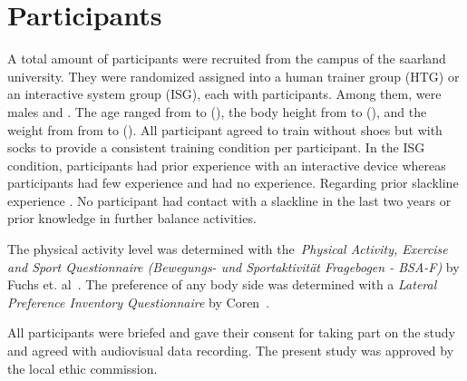 \section{Participants}\label{6_participants}
A total amount of  participants were recruited from the campus of the saarland university.
They were randomized assigned into a human trainer group (HTG) or an interactive system group (ISG), each with  participants.
Among them,  were males and .
The age ranged from  to  (), the body height from  to  (), and the weight from from  to  ().
All participant agreed to train without shoes but with socks to provide a consistent training condition per participant.
In the ISG condition,  participants had prior experience with an interactive device whereas  participants had few experience and  had no experience.
Regarding prior slackline experience .
No participant had contact with a slackline in the last two years or prior knowledge in further balance activities. 

The physical activity level was determined with the~\textit{Physical Activity, Exercise and Sport Questionnaire (Bewegungs- und Sportaktivität Fragebogen - BSA-F)} by Fuchs et. al~\cite{Fuchs2015-bsa}.
The preference of any body side was determined with a \textit{Lateral Preference Inventory Questionnaire} by Coren~\cite{Coren1993-lp}. 
 
All participants were briefed and gave their consent for taking part on the study and agreed with audiovisual data recording. The present study was approved by the local ethic commission.


